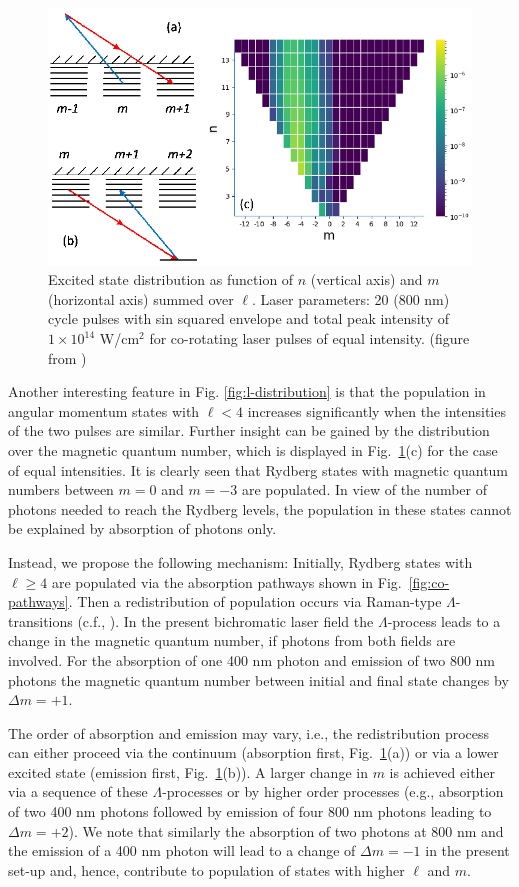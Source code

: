 \begin{figure}[!ht]
\centering
\includegraphics[width=0.6\columnwidth]{figs/Rydberg/Gebre-bicircular-Fig4.png}
\caption{\label{fig:nm-distribution}
Excited state distribution as function of $n$ (vertical axis) and $m$ (horizontal axis) summed over $\ell$. Laser parameters: 20 (800 nm) cycle pulses with sin squared envelope and total peak intensity of $1\times10^{14}$ W/cm$^2$ for co-rotating laser pulses of equal intensity. (figure from \cite{venzke2020_ryd})
}
\end{figure}

Another interesting feature in Fig. \ref{fig:l-distribution} is that the population in angular momentum states with $\ell < 4$ increases significantly when the intensities of the two pulses are similar. Further insight can be gained by the distribution over the magnetic quantum number, which is displayed in Fig.~\ref{fig:nm-distribution}(c) for the case of equal intensities. It is clearly seen that Rydberg states with magnetic quantum numbers between $m=0$ and $m=-3$ are populated. In view of the number of photons needed to reach the Rydberg levels, the population in these states cannot be explained by absorption of photons only. 

Instead, we propose the following mechanism: Initially, Rydberg states with $\ell \ge 4$ are populated via the absorption pathways shown in Fig.\ \ref{fig:co-pathways}. Then a redistribution of population occurs via Raman-type $\Lambda$-transitions (c.f., \cite{gray1978,fedorov1996}). In the present bichromatic laser field the $\Lambda$-process leads to a change in the magnetic quantum number, if photons from both fields are involved. For the absorption of one 400 nm photon and emission of two 800 nm photons the magnetic quantum number between initial and final state changes by $\Delta m = +1$.
 
The order of absorption and emission may vary, i.e., the redistribution process can either proceed via the continuum (absorption first, Fig.~\ref{fig:nm-distribution}(a)) or via a lower excited state (emission first, Fig.~\ref{fig:nm-distribution}(b)). A larger change in $m$ is achieved either via a sequence of these $\Lambda$-processes or by higher order processes (e.g., absorption of two 400 nm photons followed by emission of four 800 nm photons leading to $\Delta m = +2$). We note that similarly the absorption of two photons at 800 nm and the emission of a 400 nm photon will lead to a change of $\Delta m = -1$ in the present set-up and, hence, contribute to population of states with higher $\ell$ and $m$.

